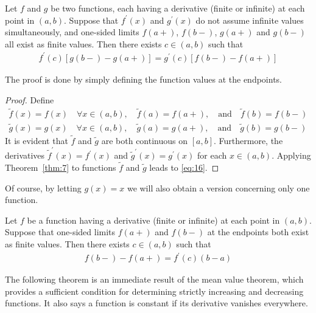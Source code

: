 \documentclass[thmcnt=section, 12pt]{my-elegantbook}
\begin{document}
\begin{theorem} \label{thm:84}
    Let $f$ and $g$ be two functions, each having a derivative (finite or infinite) at each point in $(a, b)$. Suppose that $f^\prime(x)$ and $g^\prime(x)$ do not assume infinite values simultaneously, and one-sided limits $f(a+)$, $f(b-)$, $g(a+)$ and $g(b-)$ all exist as finite values. Then there exists $c \in (a, b)$ such that 
    \begin{align}
        f^\prime(c) [g(b-) - g(a+)]
        = g^\prime(c) [f(b-) - f(a+)]
        \label{eq:16}
    \end{align} 
\end{theorem}

\par The proof is done by simply defining the function values at the endpoints.

\begin{proof}
    Define
    \begin{align*}
        \tilde{f}(x) = f(x) \quad \forall x \in (a, b),
        \quad
        \tilde{f}(a) = f(a+),
        \quad \text{and} \quad
        \tilde{f}(b) = f(b-) \\ 
        \tilde{g}(x) = g(x) \quad \forall x \in (a, b),
        \quad
        \tilde{g}(a) = g(a+),
        \quad \text{and} \quad
        \tilde{g}(b) = g(b-)
    \end{align*}
    It is evident that $\tilde{f}$ and $\tilde{g}$ are both continuous on $[a, b]$. Furthermore, the derivatives $\tilde{f}^\prime(x) = f^\prime(x)$ and $\tilde{g}^\prime(x) = g^\prime(x)$ for each $x \in (a, b)$. Applying Theorem~\ref{thm:7} to functions $\tilde{f}$ and $\tilde{g}$ leads to \eqref{eq:16}.
\end{proof}

Of course, by letting $g(x) = x$
we will also obtain a version concerning
only one function.

\begin{theorem} \label{thm:85}
    Let $f$ be a function having 
	a derivative (finite or infinite) 
	at each point in $(a, b)$. 
	Suppose that one-sided limits $f(a+)$ and $f(b-)$ at the endpoints
	both exist as finite values. 
	Then there exists $c \in (a, b)$ such that 
    \begin{align*}
		f(b-) - f(a+)
        = f^\prime(c) (b - a)
	\end{align*} 
\end{theorem}


\par The following theorem is an immediate result of the mean value theorem, which provides a sufficient condition for determining strictly increasing and decreasing functions. It also says a function is constant if its derivative vanishes everywhere.
\end{document}
